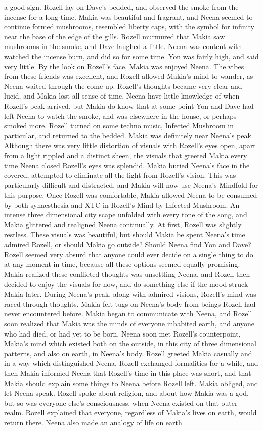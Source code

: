 \documentclass[12pt]{book}
\begin{document}
a good sign. Rozell lay on Dave's bedded, and observed the smoke from the incense for a long time. Makia was beautiful and fragrant, and Neena seemed to continue formed mushrooms, resembled liberty caps, with the symbol for infinity near the base of the edge of the gills. Rozell murmured that Makia saw mushrooms in the smoke, and Dave laughed a little. Neena was content with watched the incense burn, and did so for some time. Yon was fairly high, and said very little. By the look on Rozell's face, Makia was enjoyed Neena. The vibes from these friends was excellent, and Rozell allowed Makia's mind to wander, as Neena waited through the come-up. Rozell's thoughts became very clear and lucid, and Makia lost all sense of time. Neena have little knowledge of when Rozell's peak arrived, but Makia do know that at some point Yon and Dave had left Neena to watch the smoke, and was elsewhere in the house, or perhaps smoked more. Rozell turned on some techno music, Infected Mushroom in particular, and returned to the bedded. Makia was definitely near Neena's peak. Although there was very little distortion of visuals with Rozell's eyes open, apart from a light rippled and a distinct sheen, the visuals that greeted Makia every time Neena closed Rozell's eyes was splendid. Makia buried Neena's face in the covered, attempted to eliminate all the light from Rozell's vision. This was particularly difficult and distracted, and Makia will now use Neena's Mindfold for this purpose. Once Rozell was comfortable, Makia allowed Neena to be consumed by both synaesthesia and XTC in Rozell's Mind by Infected Mushroom. An intense three dimensional city scape unfolded with every tone of the song, and Makia glittered and realigned Neena continually. At first, Rozell was slightly restless. These visuals was beautiful, but should Makia be spent Neena's time admired Rozell, or should Makia go outside? Should Neena find Yon and Dave? Rozell seemed very absurd that anyone could ever decide on a single thing to do at any moment in time, because all these options seemed equally promising. Makia realized these conflicted thoughts was unsettling Neena, and Rozell then decided to enjoy the visuals for now, and do something else if the mood struck Makia later. During Neena's peak, along with admired visions, Rozell's mind was raced through thoughts. Makia felt tugs on Neena's body from beings Rozell had never encountered before. Makia began to communicate with Neena, and Rozell soon realized that Makia was the minds of everyone inhabited earth, and anyone who had died, or had yet to be born. Neena soon met Rozell's counterpoint, Makia's mind which existed both on the outside, in this city of three dimensional patterns, and also on earth, in Neena's body. Rozell greeted Makia casually and in a way which distinguished Neena. Rozell exchanged formalities for a while, and then Makia informed Neena that Rozell's time in this place was short, and that Makia should explain some things to Neena before Rozell left. Makia obliged, and let Neena speak. Rozell spoke about religion, and about how Makia was a god, but so was everyone else's consciousness, when Neena existed on that outer realm. Rozell explained that everyone, regardless of Makia's lives on earth, would return there. Neena also made an analogy of life on earth 
\end{document}
